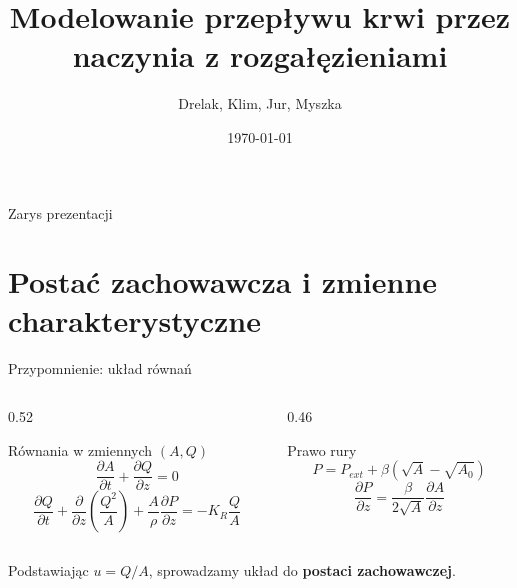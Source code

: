 \documentclass[aspectratio=169]{beamer}
\title{Modelowanie przepływu krwi przez naczynia z rozgałęzieniami}
\author{Drelak, Klim, Jur, Myszka}
\date{\today}
\begin{document}
\begin{frame}[plain]
    \vfill
    \noindent
    
    \vfill
\end{frame}

\begin{frame}{Zarys prezentacji}
    \tableofcontents
\end{frame}


\section{Postać zachowawcza i zmienne charakterystyczne}

\begin{frame}{Przypomnienie: układ równań}
  \begin{columns}
    \begin{column}{0.52\textwidth}
      \begin{block}{Równania w zmiennych $(A,Q)$}
        \[
          \frac{\partial A}{\partial t} + \frac{\partial Q}{\partial z} = 0
        \]
        \[
          \frac{\partial Q}{\partial t} + \frac{\partial}{\partial z}\!\left(\frac{Q^2}{A}\right) + \frac{A}{\rho}\frac{\partial P}{\partial z} = -K_R\frac{Q}{A}
        \]
      \end{block}
    \end{column}
    \begin{column}{0.46\textwidth}
      \begin{block}{Prawo rury}
        \[
          P = P_{ext} + \beta(\sqrt{A}-\sqrt{A_0})
        \]
        \[
          \frac{\partial P}{\partial z} = \frac{\beta}{2\sqrt{A}}\frac{\partial A}{\partial z}
        \]
      \end{block}
    \end{column}
  \end{columns}
  \vspace{0.6em}
  \centering
  Podstawiając $u = Q/A$, sprowadzamy układ do \textbf{postaci zachowawczej}.
\end{frame}
\end{document}
